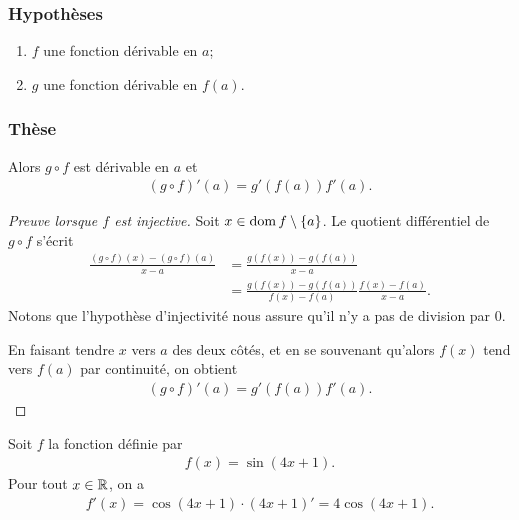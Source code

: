 \documentclass[main.tex]{subfiles}
\begin{document}
\begin{proposition}

    \subsubsection{Hypothèses}

    \begin{enumerate}
        \item $f$ une fonction dérivable en $a$;
        \item $g$ une fonction dérivable en $f(a)$.
    \end{enumerate}

    \subsubsection{Thèse}

    Alors $g \circ f$ est dérivable en $a$ et
    \begin{align}
        (g \circ f)'(a) = g'(f(a)) f'(a).
    \end{align}
\end{proposition}
\begin{proof}[Preuve lorsque $f$ est injective]
    Soit $x \in \operatorname{dom} f \setminus \{a\}$.
    Le quotient différentiel de $g \circ f$ s'écrit
    \begin{align}
        \frac {(g \circ f)(x) - (g \circ f)(a)} {x - a}
        &= \frac {g(f(x)) - g(f(a))} {x - a}\\
        &= \frac {g(f(x)) - g(f(a))} {f(x) - f(a)} \frac {f(x) - f(a)} {x - a}.
    \end{align}
    Notons que l'hypothèse d'injectivité nous assure qu'il n'y a pas de division par $0$.

    En faisant tendre $x$ vers $a$ des deux côtés,
    et en se souvenant qu'alors $f(x)$ tend vers $f(a)$ par continuité,
    on obtient
    \begin{align}
        (g \circ f)'(a) = g'(f(a)) f'(a).
    \end{align}
\end{proof}

\begin{example}
    Soit $f$ la fonction définie par 
    \begin{align}
        f(x) = \sin (4x + 1).
    \end{align}
    Pour tout $x \in \mathbb{R}$, on a 
    \begin{align}
        f'(x) = \cos (4x + 1) \cdot (4x + 1)' = 4\cos (4x + 1).
    \end{align}
\end{example}
\end{document}
